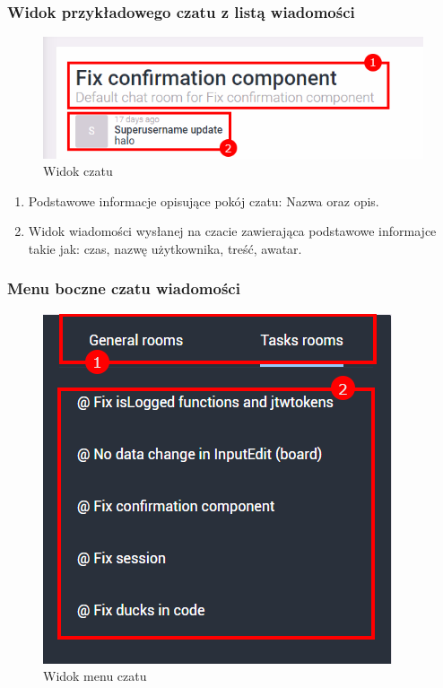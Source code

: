 \documentclass[eng,printmode]{mgr}
\begin{document}
\subsubsection{Widok przykładowego czatu z listą wiadomości}
\begin{figure}[H]
  \begin{center}
  \includegraphics[scale=0.75]{chat}
  \end{center}
  \caption{Widok czatu}
\end{figure}
\begin{enumerate}
  \item Podstawowe informacje opisujące pokój czatu: Nazwa oraz opis.
  \item Widok wiadomości wysłanej na czacie zawierająca podstawowe informajce takie jak: czas, nazwę użytkownika, treść, awatar.
\end{enumerate}
\newpage

\subsubsection{Menu boczne czatu wiadomości}
\begin{figure}[H]
  \begin{center}
  \includegraphics[scale=0.8]{task_chat_lists}
  \end{center}
  \caption{Widok menu czatu}
\end{figure}
\end{document}
